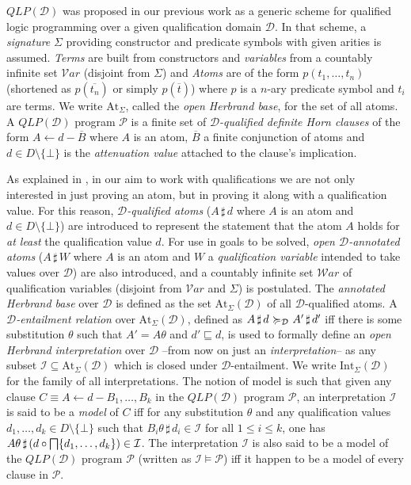 \documentclass{sigplanconf}
\newcommand{\qdom}{\mathcal{D}} \newcommand{\dqdom}{D \setminus \{\bot\}} \newcommand{\bqdom}{(D \setminus \{\bot\}) \uplus \{?\}}
\newcommand{\simrel}{\mathcal{R}}
\newcommand{\qlp}[1]{QLP({#1})} \newcommand{\slp}[2]{SLP({#1,#2})} \newcommand{\sqlp}[2]{SQLP({#1,#2})} \newcommand{\bqlp}[1]{BQLP({#1})} \newcommand{\clp}[1]{CLP({#1})}
\newcommand{\Prog}{\mathcal{P}} \newcommand{\UProg}{\mathcal{P_U}}
\newcommand{\Var}{\mathcal V\!ar} \newcommand{\War}{\mathcal W\!ar} \newcommand{\elemset}[2]{\mathrm{#1}(#2)} \newcommand{\varset}[1]{\elemset{var}{#1}} \newcommand{\warset}[1]{\elemset{war}{#1}} \newcommand{\domset}[1]{\elemset{dom}{#1}} \newcommand{\Tp}{\mathrm{T}_{\Prog}} \newcommand{\Tpd}{\mathrm{T}_{\Prog,\qdom}} \newcommand{\Mp}{\mathcal{M}_{\Prog}} \newcommand{\M}[1]{\mathcal{M}_{#1}} \newcommand{\Atz}{\mathrm{At}_{\Sigma}} \newcommand{\QAtz}{\mathrm{At}_{\Sigma}(\qdom)} \newcommand{\intd}{\mathrm{Int}_{\Sigma}(\qdom)} \newcommand{\intrd}{\mathrm{Int}_{\Sigma}(\simrel,\qdom)} \newcommand{\sust}{\mathrm{Subst}_{\Sigma}} \newcommand{\sustd}{\sust(\qdom)} \newcommand{\I}{\mathcal{I}} \newcommand{\J}{\mathcal{J}} \newcommand{\at}[2]{#1\,\sharp\,#2} \newcommand{\ats}[1]{\overline{#1}} \newcommand{\qgets}[1]{\gets\!#1\!-} \newcommand{\sep}{~{\talloblong}~} \newcommand{\true}{\texttt{tt}} \newcommand{\false}{\texttt{ff}} \newcommand{\linear}[1]{#1_\ell}
\theoremstyle{definition}
\theoremstyle{plain}
\begin{document}
$\qlp{\qdom}$ was proposed in our previous work \cite{RR08} as a generic scheme for qualified logic programming over a given qualification domain $\qdom$. In that scheme, a \emph{signature} $\Sigma$ providing constructor and predicate symbols with given arities is assumed. \emph{Terms} are built from constructors and \emph{variables} from a countably infinite set $\Var$ (disjoint from $\Sigma$)  and \emph{Atoms} are of the form $p(t_1, \ldots, t_n)$ (shortened as $p(\ats{t_n})$ or simply $p(\ats{t})$) where $p$ is a $n$-ary predicate symbol and $t_i$ are terms. We write $\Atz$, called the \emph{open Herbrand base}, for the set of all atoms. A $\qlp{\qdom}$ program $\Prog$ is a finite set of \emph{$\qdom$-qualified definite Horn clauses} of the form $A \qgets{d} \ats{B}$ where $A$ is an atom, $\ats{B}$ a finite conjunction of atoms and $d \in \dqdom$ is the \emph{attenuation value} attached to the clause's implication.

As explained in  \cite{RR08}, in our aim to work with qualifications we are not only interested in just proving an atom, but in proving it along with a qualification value. For this reason, \emph{$\qdom$-qualified atoms} ($\at{A}{d}$ where $A$ is an atom and $d \in \dqdom$) are introduced to represent the statement that the atom $A$ holds for \emph{at least} the qualification value $d$. For use in goals to be solved, \emph{open $\qdom$-annotated atoms} ($\at{A}{W}$ where $A$ is an atom and $W$ a \emph{qualification variable} intended to take values over $\qdom$) are also introduced, and a countably infinite set $\War$ of qualification variables (disjoint from $\Var$ and $\Sigma$) is postulated. The \emph{annotated Herbrand base} over $\qdom$ is defined as the set $\QAtz$ of all $\qdom$-qualified atoms. A \emph{$\qdom$-entailment relation} over $\QAtz$, defined as $\at{A}{d} \Dentail \at{A'}{d'}$ iff there is some substitution $\theta$ such that $A' = A\theta$ and $d' \sqsubseteq d$, is used to formally define an \emph{open Herbrand interpretation} over $\qdom$ --from now on just an \emph{interpretation}-- as any subset $\I \subseteq \QAtz$ which is closed under $\qdom$-entailment. We write $\intd$ for the family of all interpretations. The notion of model is such that given any clause $C \equiv A \qgets{d} B_1, \ldots, B_k$ in the $\qlp{\qdom}$ program $\Prog$, an interpretation $\I$ is said to be a \emph{model} of $C$ iff for any substitution $\theta$ and any qualification values $d_1, \ldots, d_k \in \dqdom$ such that $\at{B_i\theta}{d_i} \in \I$ for all $1 \le i \le k$, one has $\at{A\theta}{(d \circ \infi \{d_1, \ldots, d_k\})} \in \I$. The interpretation $\I$ is also said to be a model of the $\qlp{\qdom}$ program $\Prog$ (written as $\I \models \Prog$) iff it happen to be a model of every clause in $\Prog$.
\end{document}
